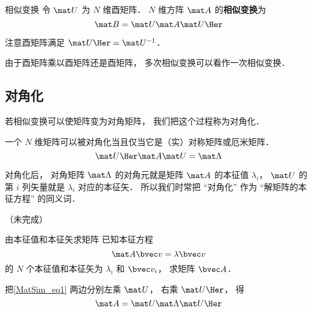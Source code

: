 

\begin{definition}{相似变换}
令 $\mat U$ 为 $N$ 维酉矩阵． $N$ 维方阵 $\mat A$ 的\textbf{相似变换}为
\begin{equation}
\mat B = \mat U \mat A \mat U\Her
\end{equation}
\end{definition}

注意酉矩阵满足 $\mat U\Her = \mat U^{-1}$．

由于酉矩阵乘以酉矩阵还是酉矩阵， 多次相似变换可以看作一次相似变换．

\subsection{对角化}
若相似变换可以使矩阵变为对角矩阵， 我们把这个过程称为对角化．

一个 $N$ 维矩阵可以被对角化当且仅当它是（实）对称矩阵或厄米矩阵．
\begin{equation}\label{MatSim_eq1}
\mat U\Her \mat A \mat U = \mat \Lambda
\end{equation}

对角化后， 对角矩阵 $\mat \Lambda$ 的对角元就是矩阵 $\mat A$ 的本征值 $\lambda_i$， $\mat U$ 的第 $i$ 列矢量就是 $\lambda_i$ 对应的本征矢． 所以我们时常把 “对角化” 作为 “解矩阵的本征方程” 的同义词．

（未完成）

\begin{example}{由本征值和本征矢求矩阵}
已知本征方程
\begin{equation}
\mat A \bvec v = \lambda \bvec v
\end{equation}
的 $N$ 个本征值和本征矢为 $\lambda_i$ 和 $\bvec v_i$， 求矩阵 $\bvec A$．

把\autoref{MatSim_eq1} 两边分别左乘 $\mat U$， 右乘 $\mat U\Her$， 得
\begin{equation}
\mat A = \mat U \mat \Lambda \mat U\Her
\end{equation}
\end{example}
